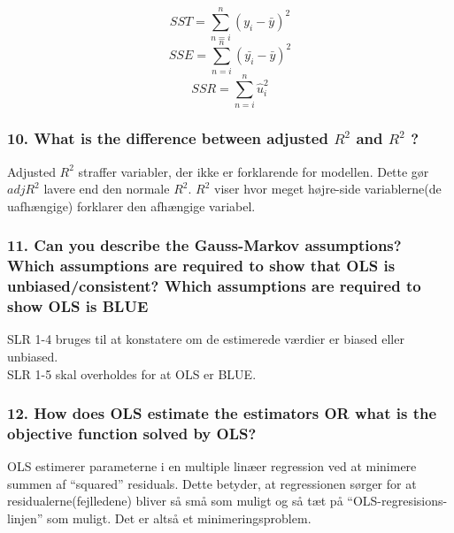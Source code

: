 \documentclass[
  10pt,
]{article}
\begin{document}
\[ SST=\sum\limits_{n=i}^n(y_i-\bar{y})^2\]
\[ SSE=\sum\limits_{n=i}^n(\bar{y_i}-\bar{y})^2\]
\[ SSR=\sum\limits_{n=i}^n\hat{u}_i^2 \]

\hypertarget{what-is-the-difference-between-adjusted-r2-and-r2}{%
\subsubsection{\texorpdfstring{10. What is the difference between
adjusted \(R^2\) and \(R^2\)
?}{10. What is the difference between adjusted R\^{}2 and R\^{}2 ?}}\label{what-is-the-difference-between-adjusted-r2-and-r2}}

Adjusted \(R^2\) straffer variabler, der ikke er forklarende for
modellen. Dette gør \(adjR^2\) lavere end den normale \(R^2\). \(R^2\)
viser hvor meget højre-side variablerne(de uafhængige) forklarer den
afhængige variabel.

\hypertarget{can-you-describe-the-gauss-markov-assumptions-which-assumptions-are-required-to-show-that-ols-is-unbiasedconsistent-which-assumptions-are-required-to-show-ols-is-blue}{%
\subsubsection{11. Can you describe the Gauss-Markov assumptions? Which
assumptions are required to show that OLS is unbiased/consistent? Which
assumptions are required to show OLS is
BLUE}\label{can-you-describe-the-gauss-markov-assumptions-which-assumptions-are-required-to-show-that-ols-is-unbiasedconsistent-which-assumptions-are-required-to-show-ols-is-blue}}

SLR 1-4 bruges til at konstatere om de estimerede værdier er biased
eller unbiased.\\
SLR 1-5 skal overholdes for at OLS er BLUE.

\hypertarget{how-does-ols-estimate-the-estimators-or-what-is-the-objective-function-solved-by-ols}{%
\subsubsection{12. How does OLS estimate the estimators OR what is the
objective function solved by
OLS?}\label{how-does-ols-estimate-the-estimators-or-what-is-the-objective-function-solved-by-ols}}

OLS estimerer parameterne i en multiple linæer regression ved at
minimere summen af ``squared'' residuals. Dette betyder, at regressionen
sørger for at residualerne(fejlledene) bliver så små som muligt og så
tæt på ``OLS-regresisions-linjen'' som muligt. Det er altså et
minimeringsproblem.
\end{document}
